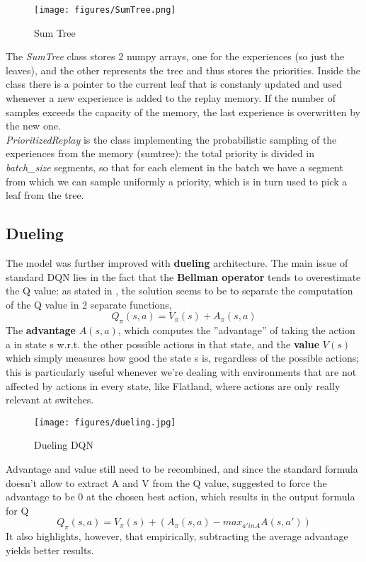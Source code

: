  \begin{figure}[H] 
\texttt{[image: figures/SumTree.png]}
\centering
\caption{Sum Tree}
\label{fig:s4} 
\end{figure}
\noindent
The \textit{SumTree} class stores 2 numpy arrays, one for the experiences (so just the leaves), and the other represents the tree and thus stores the priorities. Inside the class there is a pointer to the current leaf that is constanly updated and used whenever a new experience is added to the replay memory. If the number of samples exceeds the capacity of the memory, the last experience is overwritten by the new one. \\
\textit{PrioritizedReplay} is the class implementing the probabilistic sampling of the experiences from the memory (sumtree): the total priority is divided in \textit{batch\_size} segments, so that for each element in the batch we have a segment from which we can sample uniformly a priority, which is in turn used to pick a leaf from the tree. 	

\subsection{Dueling}

The model was further improved with \textbf{dueling} architecture. The main issue of standard DQN lies in the fact that the \textbf{Bellman operator} tends to overestimate the Q value: as stated in \cite{dueling}, the solution seems to be to separate the computation of the Q value in 2 separate functions, $$Q_{\pi}(s,a) = V_{\pi}(s) + A_{\pi}(s,a) $$ The \textbf{advantage} $A(s,a)$, which computes the  ''advantage'' of taking the action a in state s w.r.t. the other possible actions in that state, and the \textbf{value} $V(s)$ which simply measures how good the state s is, regardless of the possible actions; this is particularly useful whenever we're dealing with environments that are not affected by actions in every state, like Flatland, where actions are only really relevant at switches.

\begin{figure}[H] 
\texttt{[image: figures/dueling.jpg]}
\centering
\caption{Dueling DQN}
\label{fig:s5} 
\end{figure}
\noindent
Advantage and value still need to be recombined, and since the standard formula doesn't allow to extract A and V from the Q value, \cite{dueling} suggested to force the advantage to be 0 at the chosen best action, which results in the output formula for Q $$Q_{\pi}(s,a) = V_{\pi}(s) + (A_{\pi}(s,a) - max_{a' in A} A(s,a'))$$ It also highlights, however, that empirically, subtracting the average advantage yields better results.


